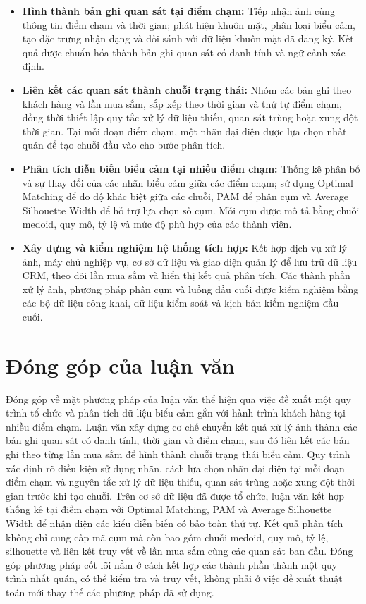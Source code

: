 \documentclass[../LuanVan.tex]{subfiles}
\begin{document}
\begin{itemize}
    \item \textbf{Hình thành bản ghi quan sát tại điểm chạm:} Tiếp nhận ảnh cùng thông tin điểm chạm và thời gian; phát hiện khuôn mặt, phân loại biểu cảm, tạo đặc trưng nhận dạng và đối sánh với dữ liệu khuôn mặt đã đăng ký. Kết quả được chuẩn hóa thành bản ghi quan sát có danh tính và ngữ cảnh xác định.

    \item \textbf{Liên kết các quan sát thành chuỗi trạng thái:} Nhóm các bản ghi theo khách hàng và lần mua sắm, sắp xếp theo thời gian và thứ tự điểm chạm, đồng thời thiết lập quy tắc xử lý dữ liệu thiếu, quan sát trùng hoặc xung đột thời gian. Tại mỗi đoạn điểm chạm, một nhãn đại diện được lựa chọn nhất quán để tạo chuỗi đầu vào cho bước phân tích.

    \item \textbf{Phân tích diễn biến biểu cảm tại nhiều điểm chạm:} Thống kê phân bố và sự thay đổi của các nhãn biểu cảm giữa các điểm chạm; sử dụng Optimal Matching để đo độ khác biệt giữa các chuỗi, PAM để phân cụm và Average Silhouette Width để hỗ trợ lựa chọn số cụm. Mỗi cụm được mô tả bằng chuỗi medoid, quy mô, tỷ lệ và mức độ phù hợp của các thành viên.

    \item \textbf{Xây dựng và kiểm nghiệm hệ thống tích hợp:} Kết hợp dịch vụ xử lý ảnh, máy chủ nghiệp vụ, cơ sở dữ liệu và giao diện quản lý để lưu trữ dữ liệu CRM, theo dõi lần mua sắm và hiển thị kết quả phân tích. Các thành phần xử lý ảnh, phương pháp phân cụm và luồng đầu cuối được kiểm nghiệm bằng các bộ dữ liệu công khai, dữ liệu kiểm soát và kịch bản kiểm nghiệm đầu cuối.
\end{itemize}

\section{Đóng góp của luận văn}
\label{section:1.3}

Đóng góp về mặt phương pháp của luận văn thể hiện qua việc đề xuất một quy trình tổ chức và phân tích dữ liệu biểu cảm gắn với hành trình khách hàng tại nhiều điểm chạm. Luận văn xây dựng cơ chế chuyển kết quả xử lý ảnh thành các bản ghi quan sát có danh tính, thời gian và điểm chạm, sau đó liên kết các bản ghi theo từng lần mua sắm để hình thành chuỗi trạng thái biểu cảm. Quy trình xác định rõ điều kiện sử dụng nhãn, cách lựa chọn nhãn đại diện tại mỗi đoạn điểm chạm và nguyên tắc xử lý dữ liệu thiếu, quan sát trùng hoặc xung đột thời gian trước khi tạo chuỗi. Trên cơ sở dữ liệu đã được tổ chức, luận văn kết hợp thống kê tại điểm chạm với Optimal Matching, PAM và Average Silhouette Width để nhận diện các kiểu diễn biến có bảo toàn thứ tự. Kết quả phân tích không chỉ cung cấp mã cụm mà còn bao gồm chuỗi medoid, quy mô, tỷ lệ, silhouette và liên kết truy vết về lần mua sắm cùng các quan sát ban đầu. Đóng góp phương pháp cốt lõi nằm ở cách kết hợp các thành phần thành một quy trình nhất quán, có thể kiểm tra và truy vết, không phải ở việc đề xuất thuật toán mới thay thế các phương pháp đã sử dụng.
\end{document}
